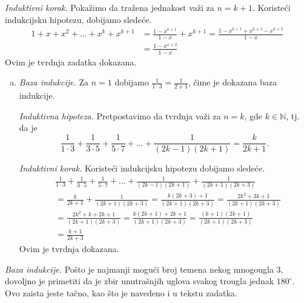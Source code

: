 {\it Induktivni korak.} Poka\v zimo da tra\v zena jednakost va\v zi za $n=k+1$. Koriste\' ci indukcijsku hipotezu, dobijamo slede\' ce.
\begin{align*}
1+x+x^2+...+x^k+x^{k+1}&=\frac{1-x^{k+1}}{1-x}+x^{k+1}=\frac{1-x^{k+1}+x^{k+1}-x^{k+2}}{1-x}\\
&=\frac{1-x^{x+2}}{1-x}
\end{align*}
Ovim je tvrdnja zadatka dokazana.

\begin{enumerate}[(a)]
\item[(b)] {\it Baza indukcije.} Za $n=1$ dobijamo $\displaystyle\frac 1{1\cdot 3}=\frac 1{2+1}$, \v cime je dokazana baza indukcije.

{\it Induktivna hipoteza.} Pretpostavimo da tvrdnja va\v zi za $n=k$, gde $k\in\mathbb N$, tj. da je
\[\frac1{1\cdot 3}+\frac 1{3\cdot 5}+\frac 1{5\cdot 7}+...+\frac 1{(2k-1)(2k+1)}=\frac k{2k+1}.\]

{\it Induktivni korak.} Koriste\' ci indukcijsku hipotezu dobijamo slede\' ce.
\begin{align*}
&\frac1{1\cdot 3}+\frac 1{3\cdot 5}+\frac 1{5\cdot 7}+...+\frac 1{(2k-1)(2k+1)}+\frac 1{(2k+1)(2k+3)}\\
&=\frac k{2k+1}+\frac 1{(2k+1)(2k+3)}=\frac{k(2k+3)+1}{(2k+1)(2k+3)}=\frac{2k^2+3k+1}{(2k+1)(2k+3)}\\
&=\frac{2k^2+k+2k+1}{(2k+1)(2k+3)}=\frac{k(2k+1)+2k+1}{(2k+1)(2k+3)}=\frac{(k+1)(2k+1)}{(2k+1)(2k+3)}\\
&=\frac{k+1}{2k+3}
\end{align*}
Ovim je tvrdnja dokazana.
\end{enumerate}


%
%

{\it Baza indukcije.} Po\v sto je najmanji mogu\' ci broj temena nekog mnogougla $3$, dovoljno je primetiti da je zbir unutra\v snjih uglova svakog trougla jednak $180^\circ$. Ovo zaista jeste ta\v cno, kao \v sto je navedeno i u tekstu zadatka.

